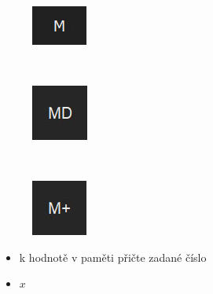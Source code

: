 \documentclass[a4paper, 12pt]{article}
\begin{document}
\\
\begin{minipage}{0.07\textwidth}
\begin{figure}[H]
\includegraphics[scale=0.7]{m.jpg}
\end{figure}
\end{minipage}
\begin{minipage}[t]{0.9\textwidth}
\end{minipage}
\\
\begin{minipage}{0.07\textwidth}
\begin{figure}[H]
\includegraphics[scale=0.7]{md.jpg}
\end{figure}
\end{minipage}
\begin{minipage}[t]{0.7\textwidth}
\end{minipage}
\\%
\begin{minipage}{0.07\textwidth}
\begin{figure}[H]
\includegraphics[scale=0.7]{implus.jpg}
\end{figure}
\end{minipage}
\begin{minipage}{1\textwidth}
\begin{itemize}
\item k hodnotě v paměti přičte zadané číslo
\item $x$ 
\end{itemize}
\end{minipage}\\
\end{document}
